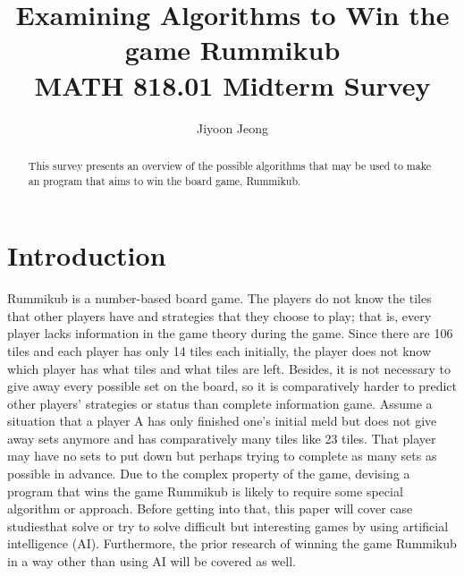 \documentclass[11pt]{article}
\title{Examining Algorithms to Win the game Rummikub\\
	\large MATH 818.01 Midterm Survey
}
\author{Jiyoon Jeong}
\date{}
\newtheorem{theorem}{Theorem}
\newcommand{\rr}{\mathbb{R}}
\begin{document}
	
	\maketitle
	
	\begin{abstract}
		This survey presents an overview of the possible algorithms that may be used to make an program that aims to win the board game, Rummikub. 
				
	\end{abstract}
	
	\section{Introduction}\label{section-introduction}
	
	Rummikub is a number-based board game. The players do not know the tiles that other players have and strategies that they choose to play; that is, every player lacks information in the game theory during the game. Since there are 106 tiles and each player has only 14 tiles each initially, the player does not know which player has what tiles and what tiles are left. Besides, it is not necessary to give away every possible set on the board, so it is comparatively harder to predict other players' strategies or status than complete information game. Assume a situation that a player A has only finished one's initial meld but does not give away sets anymore and has comparatively many tiles like 23 tiles. That player may have no sets to put down but perhaps trying to complete as many sets as possible in advance. Due to the complex property of the game, devising a program that wins the game Rummikub is likely to require some special algorithm or approach. Before getting into that, this paper will cover case studiesthat solve or try to solve difficult but interesting games by using artificial intelligence (AI). Furthermore, the prior research of winning the game Rummikub in a way other than using AI will be covered as well.
	
		
%	
	
\end{document}
